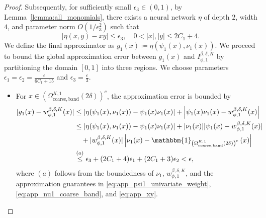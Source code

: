 \documentclass[11pt]{article}
\begin{document}
\begin{proof}
    Subsequently, for sufficiently small $\epsilon_3 \in (0,1)$, by Lemma~\ref{lemma:all_monomials}, there exists a neural network $\eta$ of depth $2$, width $4$, and parameter norm $O(1/\epsilon_3^2)$ such that 
    \begin{equation}
        |\eta(x,y) - x y| \leq  \epsilon_3, \quad 0<   |x|, |y| \leq 2C_1 + 4.
        \label{eq:app_xy}
    \end{equation}
    We define the final approximator as $g_1(x) \coloneqq  \eta(\psi_1(x), \nu_1(x))$. We proceed to bound the global approximation error between $g_1(x)$ and $I_{\phi,1}^{\beta, \delta, K}$ by partitioning the domain $[0,1]$ into three regions. We choose parameters $\epsilon_1 = \epsilon_2 = \frac{\epsilon}{6C_1+15}$ and $\epsilon_3 = \frac{\epsilon}{3}$.

    \begin{itemize}
        \item For $x \in \left(\Omega_{\mathrm{coarse,band}}^{K,1}(2 \delta)\right)^c$, the approximation error is bounded by 
        \begin{equation*}
            \begin{aligned}
                |g_1(x  ) -w_{\phi,1}^{\beta, \delta, K}(x)| &\leq |\eta(\psi_1(x), \nu_1(x)) - \psi_1(x) \nu_1(x)| + \left|\psi_1(x) \nu_1(x) - w_{\phi,1}^{\beta, \delta, K}(x)  \right| \\
                & \leq |\eta(\psi_1(x), \nu_1(x)) - \psi_1(x) \nu_1(x)|  + |\nu_1(x)||\psi_1(x) - w_{\phi,1}^{\beta, \delta, K} (x)| \\
                & \quad + |w_{\phi,1}^{\beta, \delta, K}(x)| \left| \nu_1(x) - \mathbbm{1}_{\left(\Omega_{\mathrm{coarse,band}}^{K,1}(2 \delta)\right)^c} \left( x \right) \right| \\
                & \overset{(a)}{\leq} \epsilon_3 + (2C_1 + 4) \epsilon_1 + (2C_1 + 3) \epsilon_2 <\epsilon,
            \end{aligned}
        \end{equation*}
        where $(a)$ follows from the boundedness of $\nu_1$, $w_{\phi,1}^{\beta, \delta, K}$, and the approximation guarantees in \eqref{eq:app_psi1_univariate_weight}, \eqref{eq:app_nu1_coarse_band}, and \eqref{eq:app_xy}.
        

\end{itemize}
\end{proof}
\end{document}
